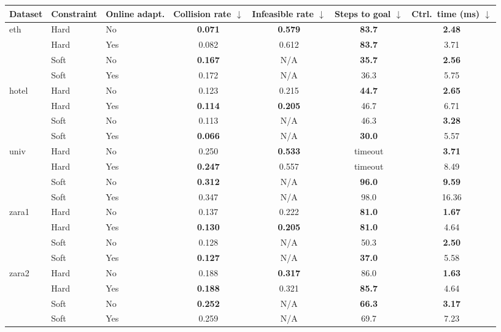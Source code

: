 \begin{tabular}{lllcccc}
\hline
Dataset & Constraint & Online adapt. & Collision rate $\downarrow$ & Infeasible rate $\downarrow$ & Steps to goal $\downarrow$ & Ctrl.\ time (ms) $\downarrow$ \\
\hline
eth & Hard & No & \textbf{0.071} & \textbf{0.579} & \textbf{83.7} & \textbf{2.48} \\
 & Hard & Yes & 0.082 & 0.612 & \textbf{83.7} & 3.71 \\
 & Soft & No & \textbf{0.167} & N/A & \textbf{35.7} & \textbf{2.56} \\
 & Soft & Yes & 0.172 & N/A & 36.3 & 5.75 \\
\hline
hotel & Hard & No & 0.123 & 0.215 & \textbf{44.7} & \textbf{2.65} \\
 & Hard & Yes & \textbf{0.114} & \textbf{0.205} & 46.7 & 6.71 \\
 & Soft & No & 0.113 & N/A & 46.3 & \textbf{3.28} \\
 & Soft & Yes & \textbf{0.066} & N/A & \textbf{30.0} & 5.57 \\
\hline
univ & Hard & No & 0.250 & \textbf{0.533} & timeout & \textbf{3.71} \\
 & Hard & Yes & \textbf{0.247} & 0.557 & timeout & 8.49 \\
 & Soft & No & \textbf{0.312} & N/A & \textbf{96.0} & \textbf{9.59} \\
 & Soft & Yes & 0.347 & N/A & 98.0 & 16.36 \\
\hline
zara1 & Hard & No & 0.137 & 0.222 & \textbf{81.0} & \textbf{1.67} \\
 & Hard & Yes & \textbf{0.130} & \textbf{0.205} & \textbf{81.0} & 4.64 \\
 & Soft & No & 0.128 & N/A & 50.3 & \textbf{2.50} \\
 & Soft & Yes & \textbf{0.127} & N/A & \textbf{37.0} & 5.58 \\
\hline
zara2 & Hard & No & 0.188 & \textbf{0.317} & 86.0 & \textbf{1.63} \\
 & Hard & Yes & \textbf{0.188} & 0.321 & \textbf{85.7} & 4.64 \\
 & Soft & No & \textbf{0.252} & N/A & \textbf{66.3} & \textbf{3.17} \\
 & Soft & Yes & 0.259 & N/A & 69.7 & 7.23 \\
\hline
\end{tabular}